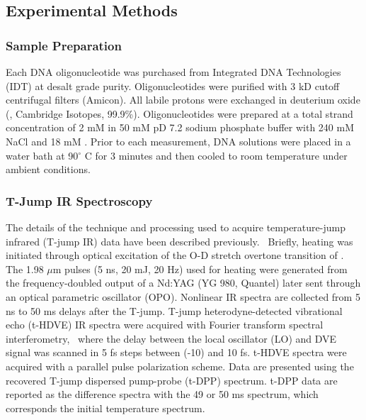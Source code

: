 \documentclass[journal=jpcbfk,manuscript=article]{achemso}
\begin{document}

\subsection{Experimental Methods}

\subsubsection{Sample Preparation}

Each DNA oligonucleotide was purchased from Integrated DNA Technologies (IDT) at desalt grade purity. Oligonucleotides were purified with 3 kD cutoff centrifugal filters (Amicon). All labile protons were exchanged in deuterium oxide (, Cambridge Isotopes, 99.9\%). Oligonucleotides were prepared at a total strand concentration of 2 mM in 50 mM pD 7.2 sodium phosphate buffer with 240 mM NaCl and 18 mM . Prior to each measurement, DNA solutions were placed in a water bath at 90$^{\circ}$ C for 3 minutes and then cooled to room temperature under ambient conditions.

\subsubsection{T-Jump IR Spectroscopy}\label{sec:Tjump}

The details of the technique and processing used to acquire temperature-jump infrared (T-jump IR) data have been described previously.~\citep{Chung2007TransientKinetics,Jones2009Heterodyne-detectedSpectroscopy,Jones2012TransientInfrared} Briefly, heating was initiated through optical excitation of the O-D stretch overtone transition of . The 1.98 $\mu$m pulses (5 ns, 20 mJ, 20 Hz) used for heating were generated from the frequency-doubled output of a Nd:YAG (YG 980, Quantel) later sent through an optical parametric oscillator (OPO). Nonlinear IR spectra are collected from 5 ns to 50 ms delays after the T-jump. T-jump heterodyne-detected vibrational echo (t-HDVE) IR spectra were acquired with Fourier transform spectral interferometry,~\citep{Jones2009Heterodyne-detectedSpectroscopy} where the delay between the local oscillator (LO) and DVE signal was scanned in 5 fs steps between (-10) and 10 fs. t-HDVE spectra were acquired with a parallel pulse polarization scheme. Data are presented using the recovered T-jump dispersed pump-probe (t-DPP) spectrum. t-DPP data are reported as the difference spectra with the 49 or 50 ms spectrum, which corresponds the initial temperature spectrum. 
\end{document}
